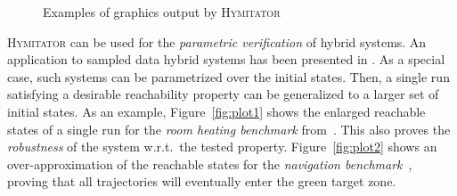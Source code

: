 \documentclass{llncs}
\newcommand{\hymitator}{\textsc{Hymitator}}
\begin{document}
\begin{figure}[t]
	\centering
	\caption{Examples of graphics output by \hymitator{}}
	\label{fig:plot_rhb}
\end{figure}


\hymitator{} can be used for the \emph{parametric verification} of hybrid systems. An application to sampled data hybrid systems has been presented in \cite{FK11}. As a special case, such systems can be parametrized over the initial states. Then, a single run satisfying a desirable reachability property can be generalized to a larger set of initial states. As an example, Figure~\ref{fig:plot1} shows the enlarged reachable states of a single run for the \emph{room   heating benchmark} from~\cite{FI2004}.
This also proves the \emph{robustness} of the system w.r.t.~the tested property. Figure~\ref{fig:plot2} shows an over-approximation of the reachable states for the \emph{navigation benchmark}~\cite{FI2004}, proving that all trajectories will eventually enter the green target zone.
\end{document}
